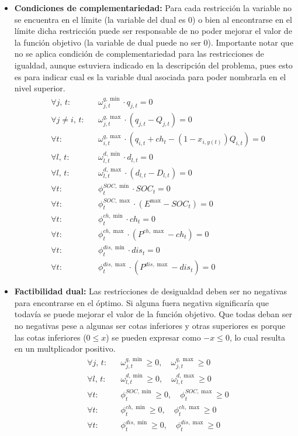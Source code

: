 \documentclass[a4paper,11pt]{article}
\begin{document}
\begin{itemize}
    \item \textbf{Condiciones de complementariedad:}
    Para cada restricción la variable no se encuentra en el límite (la variable del dual es 0) o bien al encontrarse en el límite dicha restricción puede ser responsable de no poder mejorar el valor de la función objetivo (la variable de dual puede no ser 0). Importante notar que no se aplica condición de complementariedad para las restricciones de igualdad, aunque estuviera indicado en la descripción del problema, pues esto es para indicar cual es la variable dual asociada para poder nombrarla en el nivel superior.
    \begin{align}
        &\forall j,\, t: && \omega^{q,\min}_{j,t} \cdot q_{j,t} = 0 \\
        &\forall j \neq i,\, t: && \omega^{q,\max}_{j,t} \cdot (q_{j,t} - Q_{j,t}) = 0 \\
        &\forall t: && \omega^{q,\max}_{i,t} \cdot (q_{i,t} + ch_t - (1-x_{i,y(t)}) Q_{i,t}) = 0 \\
        &\forall l,\, t: && \omega^{d,\min}_{l,t} \cdot d_{l,t} = 0 \\
        &\forall l,\, t: && \omega^{d,\max}_{l,t} \cdot (d_{l,t} - D_{l,t}) = 0 \\
        &\forall t: && \phi_t^{SOC,\min} \cdot SOC_t = 0 \\
        &\forall t: && \phi_t^{SOC,\max} \cdot (E^{\max} - SOC_t) = 0 \\
        &\forall t: && \phi_t^{ch,\min} \cdot ch_t = 0 \\
        &\forall t: && \phi_t^{ch,\max} \cdot (P^{ch,\max} - ch_t) = 0 \\
        &\forall t: && \phi_t^{dis,\min} \cdot dis_t = 0 \\
        &\forall t: && \phi_t^{dis,\max} \cdot (P^{dis,\max} - dis_t) = 0
    \end{align}

    \item \textbf{Factibilidad dual:}
    Las restricciones de desigualdad deben ser no negativas para encontrarse en el óptimo. Si alguna fuera negativa significaría que todavía se puede mejorar el valor de la función objetivo. Que todas deban ser no negativas pese a algunas ser cotas inferiores y otras superiores es porque las cotas inferiores ($0 \le x$) se pueden expresar como $-x \le 0$, lo cual resulta en un multplicador positivo.
    \begin{align}
        &\forall j,\, t: && \omega^{q,\min}_{j,t} \geq 0,\quad \omega^{q,\max}_{j,t} \geq 0 \\
        &\forall l,\, t: && \omega^{d,\min}_{l,t} \geq 0,\quad \omega^{d,\max}_{l,t} \geq 0 \\
        &\forall t: && \phi_t^{SOC,\min} \geq 0,\quad \phi_t^{SOC,\max} \geq 0 \\
        &\forall t: && \phi_t^{ch,\min} \geq 0,\quad \phi_t^{ch,\max} \geq 0 \\
        &\forall t: && \phi_t^{dis,\min} \geq 0,\quad \phi_t^{dis,\max} \geq 0
    \end{align}


\end{itemize}
\end{document}
